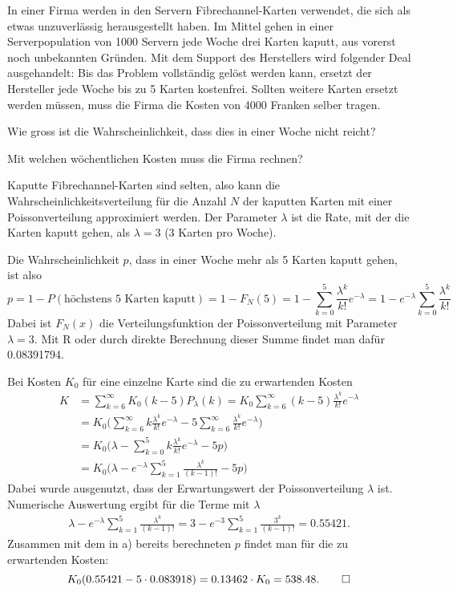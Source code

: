In einer Firma werden in den Servern Fibrechannel-Karten verwendet,
die sich als etwas unzuverlässig herausgestellt haben.
Im Mittel gehen in einer Serverpopulation von 1000 Servern jede Woche
drei Karten kaputt, aus vorerst noch unbekannten Gründen.
Mit dem Support des Herstellers wird folgender Deal
ausgehandelt: Bis das Problem vollständig gelöst werden kann, 
ersetzt der Hersteller jede Woche bis zu 5 Karten kostenfrei.
Sollten weitere Karten ersetzt werden müssen, muss die Firma
die Kosten von 4000 Franken selber tragen.
\begin{teilaufgaben}
\item
Wie gross ist die Wahrscheinlichkeit, dass dies in einer Woche nicht
reicht?
\item
Mit welchen wöchentlichen Kosten muss die Firma rechnen?
\end{teilaufgaben}

\begin{loesung}
Kaputte Fibrechannel-Karten sind selten, also kann
die Wahrscheinlichkeitsverteilung für die Anzahl $N$ der kaputten Karten
mit einer Poissonverteilung approximiert werden. Der Parameter $\lambda$
ist die Rate, mit der die Karten kaputt gehen, als $\lambda=3$ (3 Karten
pro Woche).
\begin{teilaufgaben}
\item
Die Wahrscheinlichkeit $p$, dass in einer Woche mehr als 5 Karten kaputt
gehen, ist also
\[
p=1-P(\text{höchstens 5 Karten kaputt})=1-F_N(5)
=1-\sum_{k=0}^5\frac{\lambda^k}{k!}e^{-\lambda}
=1-e^{-\lambda}\sum_{k=0}^5\frac{\lambda^k}{k!}
\]
Dabei ist $F_N(x)$ die Verteilungsfunktion der Poissonverteilung mit
Parameter $\lambda=3$. Mit R oder durch direkte Berechnung dieser
Summe findet man dafür 0.08391794.
\item
Bei Kosten $K_0$ für eine einzelne Karte sind die zu erwartenden Kosten 
\begin{align*}
K
&=
\sum_{k=6}^\infty K_0(k-5)P_\lambda(k)
=
K_0
\sum_{k=6}^\infty (k-5)\frac{\lambda^k}{k!}e^{-\lambda}
\\
&=
K_0\biggl(
\sum_{k=6}^\infty k\frac{\lambda^k}{k!}e^{-\lambda}
-5\sum_{k=6}^\infty \frac{\lambda^k}{k!}e^{-\lambda}
\biggr)
\\
&=
K_0\biggl(
\lambda-\sum_{k=0}^5k\frac{\lambda^k}{k!}e^{-\lambda}
-5p
\biggr)
\\
&=
K_0\biggl(\lambda- e^{-\lambda}\sum_{k=1}^5\frac{\lambda^k}{(k-1)!} -5p\biggr)
\end{align*}
Dabei wurde ausgenutzt, dass der Erwartungswert der Poissonverteilung
$\lambda$ ist.
Numerische Auswertung ergibt für die Terme mit $\lambda$
\begin{align*}
\lambda-e^{-\lambda}\sum_{k=1}^5\frac{\lambda^k}{(k-1)!}
=
3-e^{-3}\sum_{k=1}^5\frac{3^k}{(k-1)!}
=0.55421.
\end{align*}
Zusammen mit dem in a) bereits berechneten $p$ findet man für die
zu erwartenden Kosten:
\[
K_0(0.55421 - 5\cdot 0.083918)=0.13462\cdot K_0 = 538.48.
\qedhere
\]
\end{teilaufgaben}
\end{loesung}
